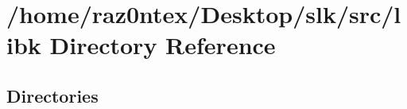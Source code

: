 \section{/home/raz0ntex/\+Desktop/slk/src/libk Directory Reference}
\label{dir_fb7b68f529be5284f09df90bb2871c05}
\subsection*{Directories}
\begin{DoxyCompactItemize}
\end{DoxyCompactItemize}
